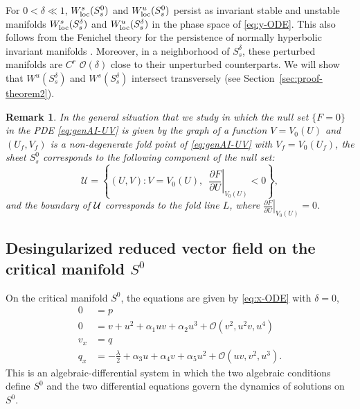 \documentclass[11pt]{article}
\numberwithin{equation}{section}
\newtheorem{remark}{Remark}[section]
\begin{document}
For $0<\delta \ll 1$, $W^s_{\rm loc}(S^0_s)$ and $W^u_{\rm loc}(S^0_s)$  persist as invariant stable and unstable manifolds $W^s_{\rm loc}(S^\delta_s)$ and $W^u_{\rm loc}(S^\delta_s)$ in the phase space of \eqref{eq:y-ODE}.
This also follows from the Fenichel theory for the persistence of normally hyperbolic invariant manifolds \cite{F1979,HPS1977,J1995}.
Moreover, in a neighborhood of $S_s^\delta$, these perturbed manifolds are $C^r$ $\mathcal{O}(\delta)$ close to their unperturbed counterparts.
We will show that $W^u(S^\delta_s)$ and $W^s(S^\delta_s)$ intersect transversely (see Section~\ref{sec:proof-theorem2}).


\begin{remark}
  In the general situation that we study in which the null set $\{ F=0 \}$ in the PDE \eqref{eq:genAI-UV} is given by the graph of a function $V=V_0(U)$ and $(U_f,V_f)$ is a non-degenerate fold point of \eqref{eq:genAI-UV} with $V_f=V_0(U_f)$,
the sheet $S_s^0$ corresponds to the following component of the null set:
\begin{equation}\label{eq:calU}
    \mathcal{U} = \left\{ (U,V) :   V=V_0(U), \, \, \,  
 \left. \frac{\partial F}{\partial U} \right\vert_{V_0(U)} < 0 \right\},
\end{equation}
and the boundary of $\cal{U}$ corresponds to the fold line $L$, where $\left. \frac{\partial F}{\partial U} \right\vert_{V_0(U)} = 0$.  
\end{remark}

\subsection{Desingularized reduced vector field on the critical manifold \texorpdfstring{$S^0$}{Lg}}

On the critical manifold $S^0$, the equations are given by \eqref{eq:x-ODE} with $\delta=0$,
\begin{equation}\label{eq:onS0}
\begin{split}
    0 &= p \\
    0 &= v + u^2 + \alpha_1 uv + \alpha_2 u^3 + \mathcal{O}(v^2,u^2v,u^4) \\
    v_x &= q \\
    q_x &= -\frac{\lambda}{2} + \alpha_3 u + \alpha_4 v + \alpha_5 u^2 + \mathcal{O}(uv,v^2,u^3).
\end{split}
\end{equation}
This is an algebraic-differential system in which the two algebraic conditions define $S^0$ and the two differential equations govern the dynamics of solutions on $S^0$.
\end{document}
